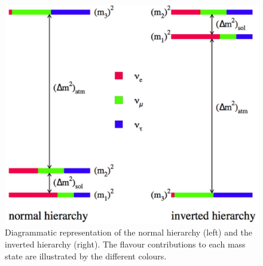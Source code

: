 \begin{figure}
    \centering
    \includegraphics[width = \largefigwidth]{figures-chap2/mass_hierarchy.jpg}
    \caption{Diagrammatic representation of the normal hierarchy (left) and the inverted hierarchy (right). The flavour contributions to each mass state are illustrated by the different colours.}
    \label{fig:my_label}
\end{figure}

